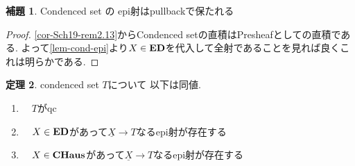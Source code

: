 \documentclass[dvipdfmx,a4paper,11pt]{article}
\theoremstyle{definition}
\newtheorem{thm}{定理}
\newtheorem{lem}[thm]{補題}
\begin{document}
 

 \begin{tcolorbox}
 [colback = white, colframe = green!35!black, fonttitle = \bfseries,breakable = true]
  \begin{lem}\cite[Lemma 3.6.2]{Bar22}
\label{lem-ep-pullback}
Condenced set の epi射はpullbackで保たれる
  \end{lem}
  \end{tcolorbox}
 \begin{proof}
 \ref{cor-Sch19-rem2.13}からCondenced setの直積はPresheafとしての直積である.
 よって\ref{lem-cond-epi}より$X \in {\bf ED}$を代入して全射であることを見れば良くこれは明らかである.
 \end{proof}

   \begin{tcolorbox}
 [colback = white, colframe = green!35!black, fonttitle = \bfseries,breakable = true]
 \begin{thm}\cite[Proposition 4.11.11]{Bar22}
 \label{thm-qc-represent}
condenced set $T$について 以下は同値.
 \begin{enumerate}
 \item　$T$がqc
 \item　$X \in {\bf ED}$があって$\underline{X}\to T$なるepi射が存在する
 \item　$X \in {\bf CHaus}$があって$\underline{X}\to T$なるepi射が存在する
 \end{enumerate}
 \end{thm}
 \end{tcolorbox}
 
\end{document}
